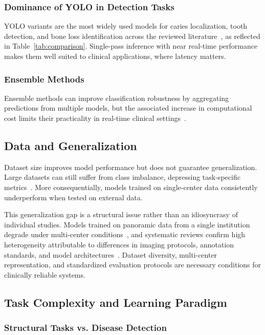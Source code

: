 \documentclass[conference]{IEEEtran}
\begin{document}
\subsubsection{Dominance of YOLO in Detection Tasks}

YOLO variants are the most widely used models for caries localization, tooth detection, and bone loss identification across the reviewed literature~\cite{nassiri2025yolo}, as reflected in Table~\ref{tab:comparison}. Single-pass inference with near real-time performance makes them well suited to clinical applications, where latency matters.

\subsubsection{Ensemble Methods}

Ensemble methods can improve classification robustness by aggregating predictions from multiple models, but the associated increase in computational cost limits their practicality in real-time clinical settings~\cite{gamal2025automated}.

\subsection{Data and Generalization}

Dataset size improves model performance but does not guarantee
generalization. Large datasets can still suffer from class imbalance,
depressing task-specific metrics~\cite{kaushik2025densenet201}. More
consequentially, models trained on single-center data consistently
underperform when tested on external data.

This generalization gap is a structural issue rather than an
idiosyncrasy of individual studies. Models trained on panoramic data
from a single institution degrade under multi-center
conditions~\cite{muresanu2024automating}, and systematic reviews
confirm high heterogeneity attributable to differences in imaging
protocols, annotation standards, and model
architectures~\cite{khubrani2025detection}. Dataset diversity,
multi-center representation, and standardized evaluation protocols are
necessary conditions for clinically reliable systems.

\subsection{Task Complexity and Learning Paradigm}

\subsubsection{Structural Tasks vs. Disease Detection}
\end{document}
